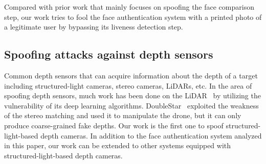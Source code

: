 Compared with prior work that mainly focuses on spoofing the face comparison step, our work tries to fool the face authentication system with a printed photo of a legitimate user by bypassing its liveness detection step.


\subsection{Spoofing attacks against depth sensors} 
Common depth sensors that can acquire information about the depth of a target including structured-light cameras,  stereo cameras, LiDARs, etc.
In the area of spoofing depth sensors, much work has been done on the LiDAR~\cite{cao2019adversarial, sun2020towards, tu2020physically} by utilizing the vulnerability of its deep learning algorithms.
DoubleStar~\cite{277102} exploited the weakness of the stereo matching and used it to manipulate the drone, but it can only produce coarse-grained fake depths. 
Our work is the first one to spoof structured-light-based depth cameras. In addition to the face authentication system analyzed in this paper, our work can be extended to other systems equipped with structured-light-based depth cameras.